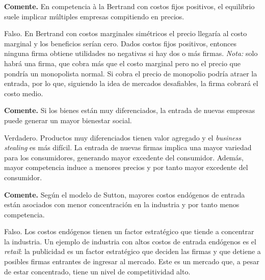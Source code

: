 \question \textbf{Comente.} En competencia à la Bertrand con costos fijos positivos, el equilibrio suele implicar múltiples empresas compitiendo en precios.
\begin{solution}
Falso. En Bertrand con costos marginales simétricos el precio llegaría al costo marginal y los beneficios serían cero. Dados costos fijos positivos, entonces ninguna firma obtiene utilidades no negativas si hay dos o más firmas. \emph{Nota:} solo habrá una firma, que cobra más que el costo marginal pero no el precio que pondría un monopolista normal. Si cobra el precio de monopolio podría atraer la entrada, por lo que, siguiendo la idea de mercados desafiables, la firma cobrará el costo medio.

\end{solution}

\question \textbf{Comente.} Si los bienes están muy diferenciados, la entrada de nuevas empresas puede generar un mayor bienestar social.
\begin{solution}
Verdadero. Productos muy diferenciados tienen valor agregado y el \emph{business stealing} es más difícil. La entrada de nuevas firmas implica una mayor variedad para los consumidores, generando mayor excedente del consumidor. Además, mayor competencia induce a menores precios y por tanto mayor excedente del consumidor.

\end{solution}

\question \textbf{Comente.} Según el modelo de Sutton, mayores costos endógenos de entrada están asociados con menor concentración en la industria y por tanto menos competencia.
\begin{solution}
Falso. Los costos endógenos tienen un factor estratégico que tiende a concentrar la industria. Un ejemplo de industria con altos costos de entrada endógenos es el \emph{retail}: la publicidad es un factor estratégico que deciden las firmas y que detiene a posibles firmas entrantes de ingresar al mercado. Este es un mercado que, a pesar de estar concentrado, tiene un nivel de competitividad alto.

\end{solution}

